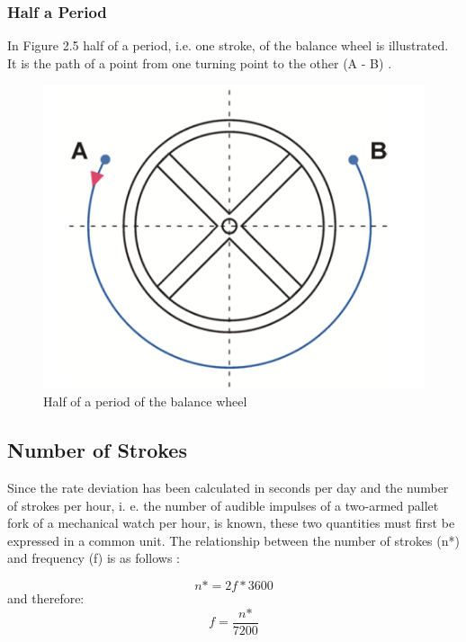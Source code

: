 \documentclass[12pt, a4paper]{report}
\begin{document}
\subsubsection{Half a Period}
In Figure 2.5 half of a period, i.e. one stroke, of the balance wheel is illustrated. It is the path of a point from one turning point to the other (A - B) \cite[p. 9]{Witschi_basics}.
    \begin{figure}[H]
    \centering
    \includegraphics[scale=0.4]{Images/Halfperiod.png}
    
    \caption{Half of a period of the balance wheel \cite[p. 9]{Witschi_basics}}
    \end{figure}
\bigskip
    
    \subsection{Number of Strokes}
    Since the rate deviation has been calculated in seconds per day and the number of strokes per hour, i. e. the number of audible impulses of a two-armed pallet fork of a mechanical watch per hour, is known, these two quantities must first be expressed in a common unit. The relationship between the number of strokes (n*) and frequency (f) is as follows \cite{Krug1987}: 
    
    \begin{displaymath}
    n\text{*} = 2f*3600
     \end{displaymath}
     and therefore:
     \begin{displaymath}
      f = \frac{n\text{*}}{7200}
     \end{displaymath}
     
\end{document}
